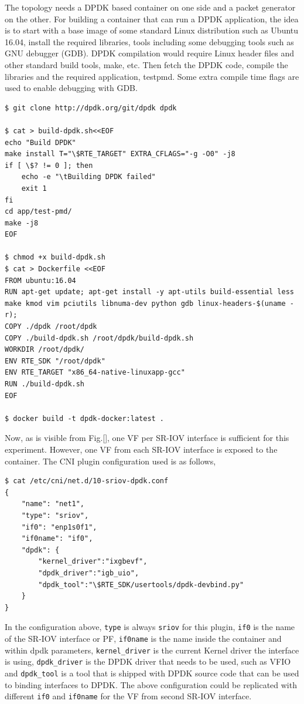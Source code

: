 \documentclass[english, 12pt, a4paper, elec, utf8, a-1b, online]{aaltothesis}
\begin{document}
The topology needs a DPDK based container on one side and a packet generator on the other. For building a container that can run a DPDK application, the idea is to start with a base image of some standard Linux distribution such as Ubuntu 16.04, install the required libraries, tools including some debugging tools such as GNU debugger (GDB). DPDK compilation would require Linux header files and other standard build tools, make, etc. Then fetch the DPDK code, compile the libraries and the required application, testpmd. Some extra compile time flags are used to enable debugging with GDB.

\begin{lstlisting}[basicstyle={\small\ttfamily}]
$ git clone http://dpdk.org/git/dpdk dpdk

$ cat > build-dpdk.sh<<EOF
echo "Build DPDK"
make install T="\$RTE_TARGET" EXTRA_CFLAGS="-g -O0" -j8
if [ \$? != 0 ]; then
    echo -e "\tBuilding DPDK failed"
    exit 1
fi
cd app/test-pmd/
make -j8
EOF

$ chmod +x build-dpdk.sh
$ cat > Dockerfile <<EOF
FROM ubuntu:16.04
RUN apt-get update; apt-get install -y apt-utils build-essential less make kmod vim pciutils libnuma-dev python gdb linux-headers-$(uname -r);
COPY ./dpdk /root/dpdk
COPY ./build-dpdk.sh /root/dpdk/build-dpdk.sh
WORKDIR /root/dpdk/
ENV RTE_SDK "/root/dpdk"
ENV RTE_TARGET "x86_64-native-linuxapp-gcc"
RUN ./build-dpdk.sh
EOF

$ docker build -t dpdk-docker:latest .
\end{lstlisting}

Now, as is visible from Fig.[], one VF per SR-IOV interface is sufficient for this experiment. However, one VF from each SR-IOV interface is exposed to the container. The CNI plugin configuration used is as follows,
\begin{lstlisting}[basicstyle={\small\ttfamily}]
$ cat /etc/cni/net.d/10-sriov-dpdk.conf
{
    "name": "net1",
    "type": "sriov",
    "if0": "enp1s0f1",
    "if0name": "if0",
    "dpdk": {
        "kernel_driver":"ixgbevf",
        "dpdk_driver":"igb_uio",
        "dpdk_tool":"\$RTE_SDK/usertools/dpdk-devbind.py"
    }
}
\end{lstlisting}

In the configuration above, \lstinline{type} is always \lstinline{sriov} for this plugin, \lstinline{if0} is the name of the SR-IOV interface or PF, \lstinline{if0name} is the name inside the container and within dpdk parameters, \lstinline{kernel_driver} is the current Kernel driver the interface is using, \lstinline{dpdk_driver} is the DPDK driver that needs to be used, such as VFIO and \lstinline{dpdk_tool} is a tool that is shipped with DPDK source code that can be used to binding interfaces to DPDK. The above configuration could be replicated with different \lstinline{if0} and \lstinline{if0name} for the VF from second SR-IOV interface.
\end{document}
